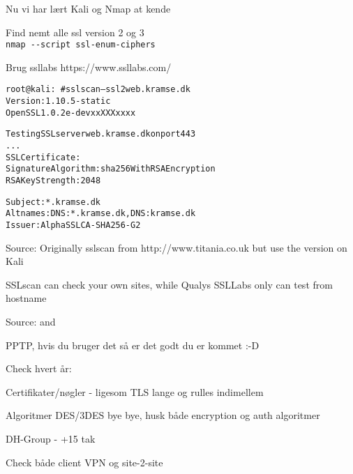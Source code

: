 \documentclass[Screen16to9,17pt]{foils}
\begin{document}


\begin{list1}
\item Nu vi har lært Kali og Nmap at kende
\begin{list2}
\item Find nemt alle ssl version 2 og 3\\
\verb+nmap --script ssl-enum-ciphers+
\item Brug ssllabs https://www.ssllabs.com/
\end{list2}
\end{list1}



\begin{alltt}\small
root@kali:~# sslscan --ssl2 web.kramse.dk
Version: 1.10.5-static
OpenSSL 1.0.2e-dev xx XXX xxxx

Testing SSL server web.kramse.dk on port 443
...
  SSL Certificate:
Signature Algorithm: sha256WithRSAEncryption
RSA Key Strength:    2048

Subject:  *.kramse.dk
Altnames: DNS:*.kramse.dk, DNS:kramse.dk
Issuer:   AlphaSSL CA - SHA256 - G2
\end{alltt}

Source:
Originally sslscan from http://www.titania.co.uk
 but use the version on Kali

SSLscan can check your own sites, while Qualys SSLLabs only can test from hostname





Source:  and \\




\begin{list1}
\item PPTP, hvis du bruger det så er det godt du er kommet :-D
\item Check hvert år:
\begin{list2}
\item Certifikater/nøgler - ligesom TLS lange og rulles indimellem
\item Algoritmer DES/3DES bye bye, husk både encryption og auth algoritmer
\item DH-Group - +15 tak
\item Check både client VPN og site-2-site
\end{list2}
\end{list1}
\end{document}
